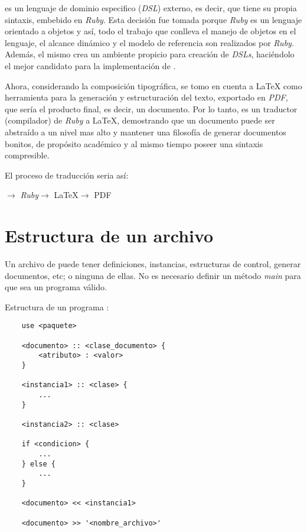 \documentclass[12pt,letterpaper,titlepage,oneside,openright]{book}
\newcommand{\OhTeX}{%
    \makebox[0.76em][c]{O}%
    \makebox[0.25em][c]{%
        \raisebox{0.14em}[0em][0em]{%
            \fontsize{0.5em}{0cm}%
                \selectfont H%
        }%
    }%
    \makebox[1.35em][c]{\TeX}%
}
\newcommand{\latex}{\LaTeX\xspace}
\newcommand{\ohtex}{\OhTeX\xspace}
\newcommand{\ruby}{\textit{Ruby}\xspace}
\begin{document}
\ohtex es un lenguaje de dominio especifico (\textit{DSL}) externo, es decir,
que tiene su propia sintaxis, embebido en \ruby. Esta decisión fue tomada porque
\ruby es un lenguaje orientado a objetos y así, todo el trabajo que conlleva el
manejo de objetos en el lenguaje, el alcance dinámico y el modelo de referencia
son realizados por \ruby. Además, el mismo crea un ambiente propicio para creación de
\textit{DSLs}, haciéndolo el mejor candidato para la implementación de \ohtex.

Ahora, considerando la composición tipográfica, se tomo en cuenta a \latex como
herramienta para la generación y estructuración del texto, exportado en
\textit{PDF}, que sería el producto final, es decir, un documento. Por lo tanto,
\ohtex es un traductor (compilador) de \ruby a \latex, demostrando que un
documento puede ser abstraído a un nivel mas alto y mantener una filosofía de
generar documentos bonitos, de propósito académico y al mismo tiempo poseer una sintaxis compresible.

El proceso de traducción seria así:

\begin{center}
    \ohtex $\longrightarrow$ \ruby $\longrightarrow$ \latex $\longrightarrow$ PDF
\end{center}

\section[Estructura de un archivo OhTeX]{Estructura de un archivo \ohtex}

Un archivo de \ohtex puede tener definiciones, instancias, estructuras de control, generar documentos, etc; o ninguna de ellas. No es necesario definir un método \textit{main} para que sea un programa válido.

Estructura de un programa \ohtex:

\begin{center}
\begin{lstlisting}
    use <paquete>

    <documento> :: <clase_documento> {
        <atributo> : <valor> 
    }

    <instancia1> :: <clase> {
        ...
    }

    <instancia2> :: <clase>

    if <condicion> {
        ...
    } else {
        ...
    }

    <documento> << <instancia1>

    <documento> >> '<nombre_archivo>'
\end{lstlisting}
\end{center}
\end{document}

